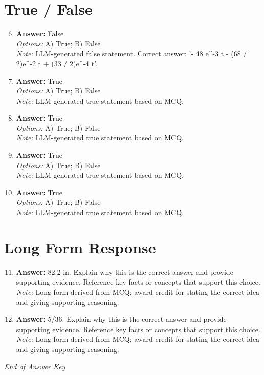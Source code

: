 \documentclass[12pt]{article}
\begin{document}
\section*{True / False}
\begin{enumerate}[label=\arabic*.]
\setcounter{enumi}{5}
\item \textbf{Answer:} False
\\ \textit{Options:} A) True; B) False
\\ \textit{Note:} LLM-generated false statement. Correct answer: '- 48 e^-3 t - (68 / 2)e^-2 t + (33 / 2)e^-4 t'.
\item \textbf{Answer:} True
\\ \textit{Options:} A) True; B) False
\\ \textit{Note:} LLM-generated true statement based on MCQ.
\item \textbf{Answer:} True
\\ \textit{Options:} A) True; B) False
\\ \textit{Note:} LLM-generated true statement based on MCQ.
\item \textbf{Answer:} True
\\ \textit{Options:} A) True; B) False
\\ \textit{Note:} LLM-generated true statement based on MCQ.
\item \textbf{Answer:} True
\\ \textit{Options:} A) True; B) False
\\ \textit{Note:} LLM-generated true statement based on MCQ.
\end{enumerate}

\section*{Long Form Response}
\begin{enumerate}[label=\arabic*.]
\setcounter{enumi}{10}
\item \textbf{Answer:} 82.2 in. Explain why this is the correct answer and provide supporting evidence. Reference key facts or concepts that support this choice.
\\ \textit{Note:} Long-form derived from MCQ; award credit for stating the correct idea and giving supporting reasoning.
\item \textbf{Answer:} 5/36. Explain why this is the correct answer and provide supporting evidence. Reference key facts or concepts that support this choice.
\\ \textit{Note:} Long-form derived from MCQ; award credit for stating the correct idea and giving supporting reasoning.
\end{enumerate}

\vfill
\noindent\textit{End of Answer Key}
\end{document}
